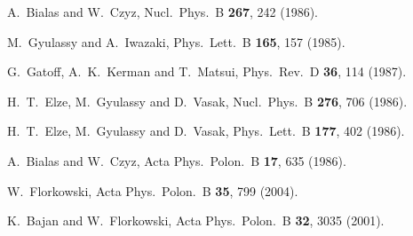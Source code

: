 \documentclass[aps,prc,a4paper,nofootinbib,
preprintnumbers,superscriptaddress,twocolumn,showpacs,showkeys]{revtex4}
\begin{document}
\begin{thebibliography}{99}
  A.~Bialas and W.~Czyz,
  Nucl.\ Phys.\ B {\bf 267}, 242 (1986).
  
  M.~Gyulassy and A.~Iwazaki,
  Phys.\ Lett.\ B {\bf 165}, 157 (1985).
  
  G.~Gatoff, A.~K.~Kerman and T.~Matsui,
  Phys.\ Rev.\ D {\bf 36}, 114 (1987).
  
  H.~T.~Elze, M.~Gyulassy and D.~Vasak,
  Nucl.\ Phys.\ B {\bf 276}, 706 (1986).
  
  H.~T.~Elze, M.~Gyulassy and D.~Vasak,
  Phys.\ Lett.\ B {\bf 177}, 402 (1986).
  
  A.~Bialas and W.~Czyz,
  Acta Phys.\ Polon.\ B {\bf 17}, 635 (1986).
  
  W.~Florkowski,
  Acta Phys.\ Polon.\ B {\bf 35}, 799 (2004).

  K.~Bajan and W.~Florkowski,
  Acta Phys.\ Polon.\ B {\bf 32}, 3035 (2001).
  

\end{thebibliography}
\end{document}
